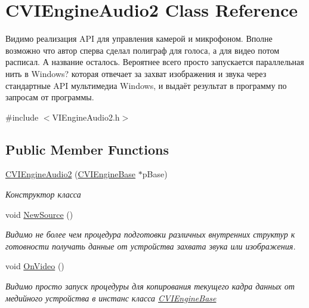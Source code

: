 \hypertarget{class_c_v_i_engine_audio2}{\section{C\+V\+I\+Engine\+Audio2 Class Reference}
\label{class_c_v_i_engine_audio2}
}


Видимо реализация A\+P\+I для управления камерой и микрофоном. Вполне возможно что автор сперва сделал полиграф для голоса, а для видео потом расписал. А название осталось. Вероятнее всего просто запускается параллельная нить в Windows? которая отвечает за захват изображения и звука через стандартные A\+P\+I мультимедиа Windows, и выдаёт результат в программу по запросам от программы.  




{\ttfamily \#include $<$V\+I\+Engine\+Audio2.\+h$>$}

\subsection*{Public Member Functions}
\begin{DoxyCompactItemize}
\item 
\hyperlink{class_c_v_i_engine_audio2_a4db9b77fbe4864a556fe9dc1238a80d8}{C\+V\+I\+Engine\+Audio2} (\hyperlink{class_c_v_i_engine_base}{C\+V\+I\+Engine\+Base} $\ast$p\+Base)
\begin{DoxyCompactList}\small\item\em Конструктор класса \end{DoxyCompactList}\item 
void \hyperlink{class_c_v_i_engine_audio2_aee0cdfbeb4e06c36cb37058b3856c927}{New\+Source} ()
\begin{DoxyCompactList}\small\item\em Видимо не более чем процедура подготовки различных внутренних структур к готовности получать данные от устройства захвата звука или изображения. \end{DoxyCompactList}\item 
void \hyperlink{class_c_v_i_engine_audio2_a249e86a49ebb16d71c276df7db8d41bb}{On\+Video} ()
\begin{DoxyCompactList}\small\item\em Видимо просто запуск процедуры для копирования текущего кадра данных от медийного устройства в инстанс класса \hyperlink{class_c_v_i_engine_base}{C\+V\+I\+Engine\+Base} \end{DoxyCompactList}\end{DoxyCompactItemize}
